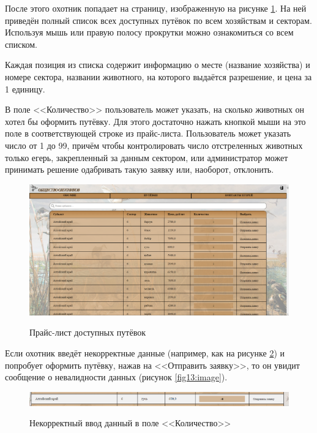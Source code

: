 	После этого охотник попадает на страницу, изображенную на рисунке \ref{fig11:image}. На ней приведён полный список всех доступных путёвок по всем хозяйствам и секторам. Используя мышь или правую полосу прокрутки можно ознакомиться со всем списком. 
	
	Каждая позиция из списка содержит информацию о месте (название хозяйства) и номере сектора, названии животного, на которого выдаётся разрешение, и цена за 1 единицу. 
	
	В поле <<Количество>> пользователь может указать, на сколько животных он хотел бы оформить путёвку. Для этого достаточно нажать кнопкой мыши на это поле в соответствующей строке из прайс-листа. Пользователь может указать число от 1 до 99, причём чтобы контролировать число отстреленных животных только егерь, закрепленный за данным сектором, или администратор может принимать решение одабривать такую заявку или, наоборот, отклонить. 
	
	\begin{figure}[h]
		\centering
		\begin{center}
			{\includegraphics[scale=0.34]{schemes/screens/menu.png}}
			\caption{Прайс-лист доступных путёвок}
			\label{fig11:image}
		\end{center}
	\end{figure}

	Если охотник введёт некорректные данные (например, как на рисунке \ref{fig12:image}) и попробует оформить путёвку, нажав на <<Отправить заявку>>, то он увидит сообщение о невалидности данных (рисунок \ref{fig13:image}).
	
	\begin{figure}[h]
		\centering
		\begin{center}
			{\includegraphics[scale=0.34]{schemes/screens/wrong_num.png}}
			\caption{Некорректный ввод данный в поле <<Количество>>}
			\label{fig12:image}
		\end{center}
	\end{figure}

